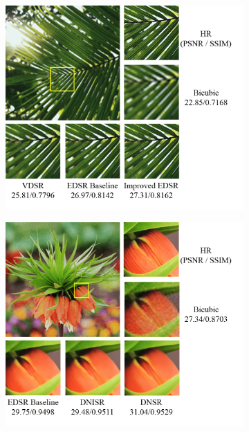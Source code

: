 \documentclass[10pt,twocolumn,letterpaper]{article}
\begin{document}
\begin{figure}[ht!]
\begin{subfigure}[t]{0.4\textwidth}
    \includegraphics[width=\textwidth]{Images/Samples/1-3.png}
\end{subfigure}
\hspace{0.05\textwidth}
\vrule
\hspace{0.1\textwidth}
\begin{subfigure}[t]{0.4\textwidth}
    \includegraphics[width=\textwidth]{Images/Samples/2-1.png}\\

\end{subfigure}
\end{figure}
\end{document}
